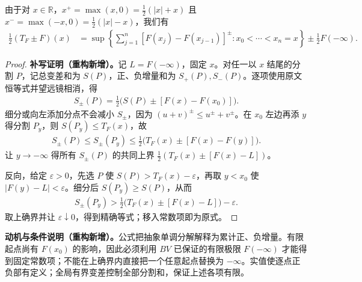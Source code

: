 \documentclass[../../main.tex]{subfiles}%
\begin{document}
\begin{proposition}\label{proposition:ch03-positive-negative-increments}
由于对 $x\in\mathbb R$，$x^+=\max(x,0)=\tfrac12(|x|+x)$ 且 $x^-=\max(-x,0)=\tfrac12(|x|-x)$，我们有
\begin{align*}
\tfrac12(T_F\pm F)(x)
&=\sup\left\{\sum_{j=1}^n[F(x_j)-F(x_{j-1})]^\pm:
x_0<\cdots<x_n=x\right\}\pm\tfrac12F(-\infty).
\end{align*}
\end{proposition}
\begin{proof}
\textbf{补写证明（重构新增）。}记 $L=F(-\infty)$，固定 $x$。对任一以 $x$ 结尾的分割 $P$，记总变差和为 $S(P)$，正、负增量和为 $S_+(P),S_-(P)$。逐项使用原文恒等式并望远镜相消，得
\begin{align*}
S_\pm(P)=\tfrac12\bigl(S(P)\pm[F(x)-F(x_0)]\bigr).
\end{align*}
细分或向左添加分点不会减小 $S_\pm$，因为 $(u+v)^\pm\le u^\pm+v^\pm$。在 $x_0$ 左边再添 $y$ 得分割 $P_y$，则 $S(P_y)\le T_F(x)$，故
\begin{align*}
S_\pm(P)\le S_\pm(P_y)\le\tfrac12\bigl(T_F(x)\pm[F(x)-F(y)]\bigr).
\end{align*}
让 $y\to-\infty$ 得所有 $S_\pm(P)$ 的共同上界 $\tfrac12(T_F(x)\pm[F(x)-L])$。

反向，给定 $\varepsilon>0$，先选 $P$ 使 $S(P)>T_F(x)-\varepsilon$，再取 $y<x_0$ 使 $|F(y)-L|<\varepsilon$。细分后 $S(P_y)\ge S(P)$，从而
\begin{align*}
S_\pm(P_y)>\tfrac12\bigl(T_F(x)\pm[F(x)-L]\bigr)-\varepsilon.
\end{align*}
取上确界并让 $\varepsilon\downarrow0$，得到精确等式；移入常数项即为原式。
\end{proof}
\begin{remark}
\textbf{动机与条件说明（重构新增）。}公式把抽象单调分解解释为累计正、负增量。有限起点尚有 $F(x_0)$ 的影响，因此必须利用 $BV$ 已保证的有限极限 $F(-\infty)$ 才能得到固定常数项；不能在上确界内直接把一个任意起点替换为 $-\infty$。实值使逐点正负部有定义；全局有界变差控制全部分割和，保证上述各项有限。
\end{remark}
\end{document}
